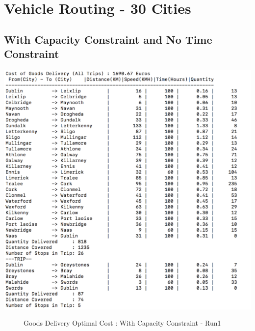 \documentclass[a4paper&11pt]{article}
\begin{document}
\section*{Vehicle Routing  - 30 Cities}
\subsection*{With Capacity Constraint and No Time Constraint}
\begin{center}
\includegraphics[scale=0.8]{30fig1.png}
\begin{figure}[H]
\caption{Goods Delivery Optimal Cost :  With Capacity Constraint - Run1}
\end{figure}
\end{center}
\end{document}
